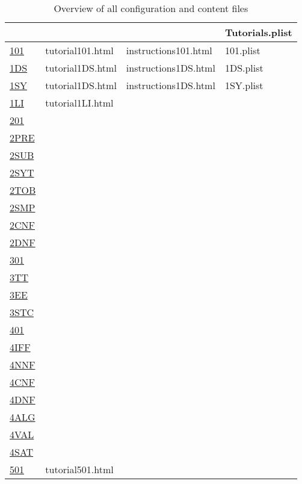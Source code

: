 \begin{table}[htdp]
\begin{center}
\begin{tabular}{llll}
&&&Tutorials.plist \\
\hline
\hline
\hyperref[tut:101]{101} & tutorial101.html & instructions101.html & 101.plist \\
\hyperref[tut:1DS]{1DS} & tutorial1DS.html & instructions1DS.html & 1DS.plist \\
\hyperref[tut:1SY]{1SY} & tutorial1DS.html & instructions1DS.html & 1SY.plist \\
\hyperref[tut:1LI]{1LI} & tutorial1LI.html & & \\
\hline
\hyperref[tut:201]{201} & \\
\hyperref[tut:2PRE]{2PRE} & \\
\hyperref[tut:2SUB]{2SUB} & \\
\hyperref[tut:2SYT]{2SYT} & \\
\hyperref[tut:2TOB]{2TOB} & \\
\hyperref[tut:2SMP]{2SMP} & \\
\hyperref[tut:2CNF]{2CNF} & \\
\hyperref[tut:2DNF]{2DNF} & \\
\hline
\hyperref[tut:301]{301} & \\
\hyperref[tut:3TT]{3TT} & \\
\hyperref[tut:3EE]{3EE} & \\
\hyperref[tut:3STC]{3STC} & \\
\hline
\hyperref[tut:401]{401} & \\
\hyperref[tut:4IFF]{4IFF} & \\
\hyperref[tut:4NNF]{4NNF} & \\
\hyperref[tut:4CNF]{4CNF} & \\
\hyperref[tut:4DNF]{4DNF} & \\
\hyperref[tut:4ALG]{4ALG} & \\
\hyperref[tut:4VAL]{4VAL} & \\
\hyperref[tut:4SAT]{4SAT} & \\
\hline
\hyperref[tut:501]{501} & tutorial501.html \\
\end{tabular}
\caption{Overview of all configuration and content files}
\label{tab:CONFIG}
\end{center}
\end{table}%

